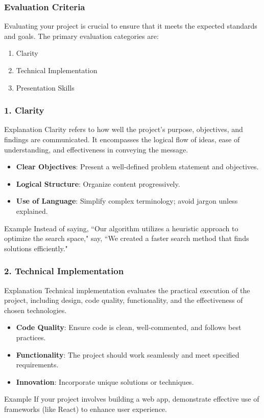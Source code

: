 \documentclass[aspectratio=169]{beamer}
\begin{document}
\begin{frame}[fragile]
    \frametitle{Evaluation Criteria}
    Evaluating your project is crucial to ensure that it meets the expected standards and goals. The primary evaluation categories are:
    \begin{enumerate}
        \item Clarity
        \item Technical Implementation
        \item Presentation Skills
    \end{enumerate}
\end{frame}

\begin{frame}[fragile]
    \frametitle{1. Clarity}
    \begin{block}{Explanation}
        Clarity refers to how well the project’s purpose, objectives, and findings are communicated. It encompasses the logical flow of ideas, ease of understanding, and effectiveness in conveying the message.
    \end{block}
    \begin{itemize}
        \item \textbf{Clear Objectives}: Present a well-defined problem statement and objectives.
        \item \textbf{Logical Structure}: Organize content progressively.
        \item \textbf{Use of Language}: Simplify complex terminology; avoid jargon unless explained.
    \end{itemize}
    \begin{block}{Example}
        Instead of saying, ``Our algorithm utilizes a heuristic approach to optimize the search space," say, ``We created a faster search method that finds solutions efficiently."
    \end{block}
\end{frame}

\begin{frame}[fragile]
    \frametitle{2. Technical Implementation}
    \begin{block}{Explanation}
        Technical implementation evaluates the practical execution of the project, including design, code quality, functionality, and the effectiveness of chosen technologies.
    \end{block}
    \begin{itemize}
        \item \textbf{Code Quality}: Ensure code is clean, well-commented, and follows best practices.
        \item \textbf{Functionality}: The project should work seamlessly and meet specified requirements.
        \item \textbf{Innovation}: Incorporate unique solutions or techniques.
    \end{itemize}
    \begin{block}{Example}
        If your project involves building a web app, demonstrate effective use of frameworks (like React) to enhance user experience.
    \end{block}
\end{frame}
\end{document}
